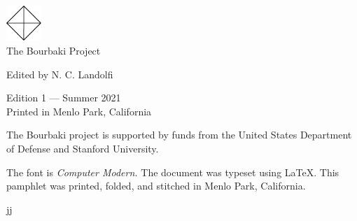 




\usepackage{tocloft}
\setlength{\cftsecnumwidth}{3em}



\begin{center}
  \includegraphics[width=0.1\textwidth]{../trademark}
  \\
  \vspace{0.5cm}
  \textsf{\Large The Bourbaki Project}

{\small \textsf{Edited by N. C. Landolfi}}
\end{center}

\vspace{\fill}

\begin{center}
  {\small \textsf{Edition 1 --- Summer 2021}} \\

  {\footnotesize \textsf{Printed in Menlo Park, California}}
\end{center}

\thispagestyle{empty}

% 
% 
\clearpage

\tableofcontents

\clearpage



\clearpage


The Bourbaki project is supported by funds from the United States Department of Defense and Stanford University.

\clearpage

\noindent\noindent The font is \textit{Computer Modern.}
The document was typeset using \LaTeX.
This pamphlet was printed, folded, and stitched in Menlo Park, California.


jj